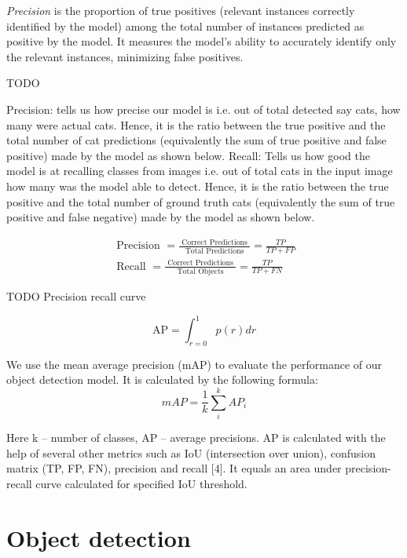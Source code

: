 \documentclass[14pt,a4paper]{extarticle}
\newcounter{e}
\numberwithin{equation}{section}
\numberwithin{figure}{section}
\begin{document}
\textit{Precision} is the proportion of true positives (relevant instances correctly identified by the model) among the total number of instances predicted as positive by the model. It measures the model's ability to accurately identify only the relevant instances, minimizing false positives.

TODO

Precision: tells us how precise our model is i.e. out of total detected say cats, how many were actual cats. Hence, it is the ratio between the true positive and the total number of cat predictions (equivalently the sum of true positive and false positive) made by the model as shown below.
Recall: Tells us how good the model is at recalling classes from images i.e. out of total cats in the input image how many was the model able to detect. Hence, it is the ratio between the true positive and the total number of ground truth cats (equivalently the sum of true positive and false negative) made by the model as shown below.

\begin{equation}
    \begin{gathered}
        \text { Precision }=\frac{\text { Correct Predictions }}{\text { Total Predictions }}=\frac{T P}{T P+F P} \\
        \text { Recall }=\frac{\text { Correct Predictions }}{\text { Total Objects }}=\frac{T P}{T P+F N}
    \end{gathered}
\end{equation}

TODO Precision recall curve

\begin{equation}
    \mathrm{AP}=\int_{r=0}^1 p(r) d r
\end{equation}


We use the mean average precision (mAP) to evaluate the performance of our object detection model. It is calculated by the following formula:
\begin{equation}
    m A P=\frac{1}{k} \sum_i^k A P_i 
\end{equation}

Here k – number of classes, AP – average precisions. AP is calculated with the help of several other metrics such as IoU (intersection over union), confusion matrix (TP, FP, FN), precision and recall [4]. It equals an area under precision-recall curve calculated for specified IoU threshold.



\newpage
\thispagestyle{empty}
\section{Object detection}
\end{document}
